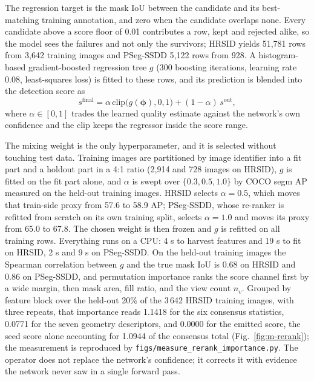 The regression target is the mask IoU between the candidate and its best-matching training annotation, and zero when the candidate overlaps none. Every candidate above a score floor of 0.01 contributes a row, kept and rejected alike, so the model sees the failures and not only the survivors; HRSID yields 51{,}781 rows from 3{,}642 training images and PSeg-SSDD 5{,}122 rows from 928. A histogram-based gradient-boosted regression tree $g$ (300 boosting iterations, learning rate 0.08, least-squares loss) is fitted to these rows, and its prediction is blended into the detection score as
\begin{equation}\label{eq:rrblend}
s^{\mathrm{final}}=\alpha\,\mathrm{clip}\bigl(g(\boldsymbol{\phi}),0,1\bigr)+(1-\alpha)\,s^{\mathrm{out}},
\end{equation}
where $\alpha\in[0,1]$ trades the learned quality estimate against the network's own confidence and the clip keeps the regressor inside the score range.

The mixing weight is the only hyperparameter, and it is selected without touching test data. Training images are partitioned by image identifier into a fit part and a holdout part in a 4:1 ratio (2{,}914 and 728 images on HRSID), $g$ is fitted on the fit part alone, and $\alpha$ is swept over $\{0.3,0.5,1.0\}$ by COCO segm AP measured on the held-out training images. HRSID selects $\alpha=0.5$, which moves that train-side proxy from 57.6 to 58.9 AP; PSeg-SSDD, whose re-ranker is refitted from scratch on its own training split, selects $\alpha=1.0$ and moves its proxy from 65.0 to 67.8. The chosen weight is then frozen and $g$ is refitted on all training rows. Everything runs on a CPU: 4 s to harvest features and 19 s to fit on HRSID, 2 s and 9 s on PSeg-SSDD. On the held-out training images the Spearman correlation between $g$ and the true mask IoU is 0.68 on HRSID and 0.86 on PSeg-SSDD, and permutation importance ranks the score channel first by a wide margin, then mask area, fill ratio, and the view count $n_v$. Grouped by feature block over the held-out 20\% of the 3\,642 HRSID training images, with three repeats, that importance reads 1.1418 for the six consensus statistics, 0.0771 for the seven geometry descriptors, and 0.0000 for the emitted score, the seed score alone accounting for 1.0944 of the consensus total (Fig.~\ref{fig:m-rerank}); the measurement is reproduced by \texttt{figs/measure\_rerank\_importance.py}. The operator does not replace the network's confidence; it corrects it with evidence the network never saw in a single forward pass.

